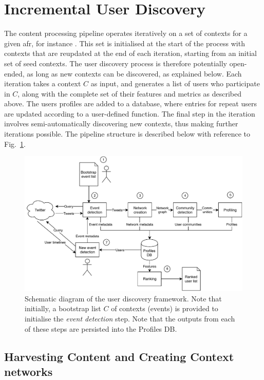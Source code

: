 \section{Incremental User Discovery} \label{sec:Pipeline}

The content processing pipeline operates iteratively on a set of contexts for a given afr, for instance . This set is initialised at the start of the process with contexts that are reupdated  at the end of each iteration, starting from an initial set of seed contexts.
The user discovery process is therefore potentially open-ended, as long as new contexts can be discovered, as explained below.
Each iteration takes a context $C$  as input, and generates a list of users who participate in $C$, along with the complete set of their features and metrics as described above. 
The users profiles are added to a database, where entries for repeat users are updated according to a user-defined function. 
The final step in the iteration involves semi-automatically discovering new contexts, thus making further iterations possible.
%
The pipeline structure is described below with reference to Fig.~\ref{fig:twitterframework}.

\begin{figure}
	\centering
	\includegraphics[width=\textwidth]{figures/TwitterFramework}
	\caption{Schematic diagram of the user discovery framework. Note that initially, a bootstrap list $C$ of contexts (events) is provided to initialise the \textit{event detection} step. 
	Note that the outputs from each of these steps are persisted into the Profiles DB.}
	\label{fig:twitterframework}
\end{figure}

\subsection{Harvesting Content and Creating Context networks} \label{sec:harvesting}


